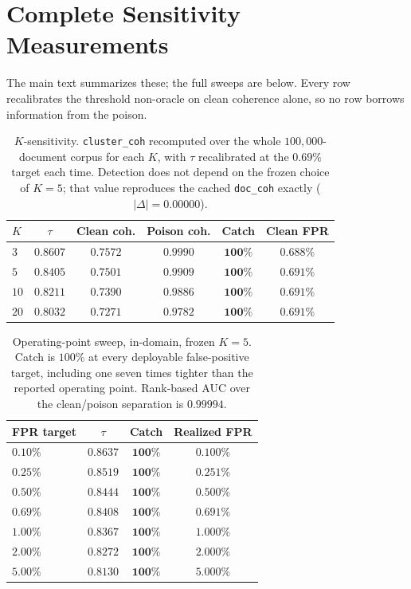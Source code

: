 \documentclass[10pt,journal,compsoc]{IEEEtran}
\begin{document}
\section{Complete Sensitivity Measurements}
\label{app:sens}
The main text summarizes these; the full sweeps are below. Every row recalibrates the threshold
non-oracle on clean coherence alone, so no row borrows information from the poison.

\begin{table}[t]
\centering
\caption{$K$-sensitivity. \texttt{cluster\_coh} recomputed over the whole $100{,}000$-document
corpus for each $K$, with $\tau$ recalibrated at the $0.69\%$ target each time. Detection does
not depend on the frozen choice of $K=5$; that value reproduces the cached \texttt{doc\_coh}
exactly ($|\Delta|=0.00000$).}
\label{tab:ksens}
\begin{tabular}{lccccc}
\toprule
$K$ & $\tau$ & Clean coh. & Poison coh. & Catch & Clean FPR \\
\midrule
$3$  & $0.8607$ & $0.7572$ & $0.9990$ & $\mathbf{100\%}$ & $0.688\%$ \\
$5$  & $0.8405$ & $0.7501$ & $0.9909$ & $\mathbf{100\%}$ & $0.691\%$ \\
$10$ & $0.8211$ & $0.7390$ & $0.9886$ & $\mathbf{100\%}$ & $0.691\%$ \\
$20$ & $0.8032$ & $0.7271$ & $0.9782$ & $\mathbf{100\%}$ & $0.691\%$ \\
\bottomrule
\end{tabular}
\end{table}

\begin{table}[t]
\centering
\caption{Operating-point sweep, in-domain, frozen $K=5$. Catch is $100\%$ at every deployable
false-positive target, including one seven times tighter than the reported operating point.
Rank-based AUC over the clean/poison separation is $0.99994$.}
\label{tab:fprsweep}
\begin{tabular}{lccc}
\toprule
FPR target & $\tau$ & Catch & Realized FPR \\
\midrule
$0.10\%$ & $0.8637$ & $\mathbf{100\%}$ & $0.100\%$ \\
$0.25\%$ & $0.8519$ & $\mathbf{100\%}$ & $0.251\%$ \\
$0.50\%$ & $0.8444$ & $\mathbf{100\%}$ & $0.500\%$ \\
$0.69\%$ & $0.8408$ & $\mathbf{100\%}$ & $0.691\%$ \\
$1.00\%$ & $0.8367$ & $\mathbf{100\%}$ & $1.000\%$ \\
$2.00\%$ & $0.8272$ & $\mathbf{100\%}$ & $2.000\%$ \\
$5.00\%$ & $0.8130$ & $\mathbf{100\%}$ & $5.000\%$ \\
\bottomrule
\end{tabular}
\end{table}
\end{document}
